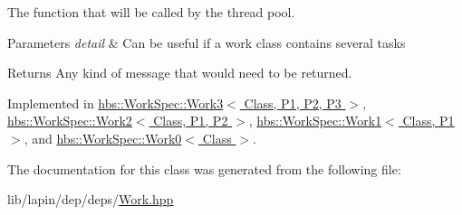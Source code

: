 The function that will be called by the thread pool. 


\begin{DoxyParams}{Parameters}
{\em detail} & Can be useful if a work class contains several tasks \\
\hline
\end{DoxyParams}
\begin{DoxyReturn}{Returns}
Any kind of message that would need to be returned. 
\end{DoxyReturn}


Implemented in \hyperlink{structhbs_1_1_work_spec_1_1_work3_aae08bdf7dfb3167f8ca748eca40212f7}{hbs\-::\-Work\-Spec\-::\-Work3$<$ Class, P1, P2, P3 $>$}, \hyperlink{structhbs_1_1_work_spec_1_1_work2_acd0cc67099d12b7bae817b06d5fb0f6b}{hbs\-::\-Work\-Spec\-::\-Work2$<$ Class, P1, P2 $>$}, \hyperlink{structhbs_1_1_work_spec_1_1_work1_a90c7f3a80817ca63e96a4e9d8c9e6047}{hbs\-::\-Work\-Spec\-::\-Work1$<$ Class, P1 $>$}, and \hyperlink{structhbs_1_1_work_spec_1_1_work0_af20a59b9e8106ba7d0e5104cbf0dd9a9}{hbs\-::\-Work\-Spec\-::\-Work0$<$ Class $>$}.



The documentation for this class was generated from the following file\-:\begin{DoxyCompactItemize}
\item 
lib/lapin/dep/deps/\hyperlink{_work_8hpp}{Work.\-hpp}\end{DoxyCompactItemize}
